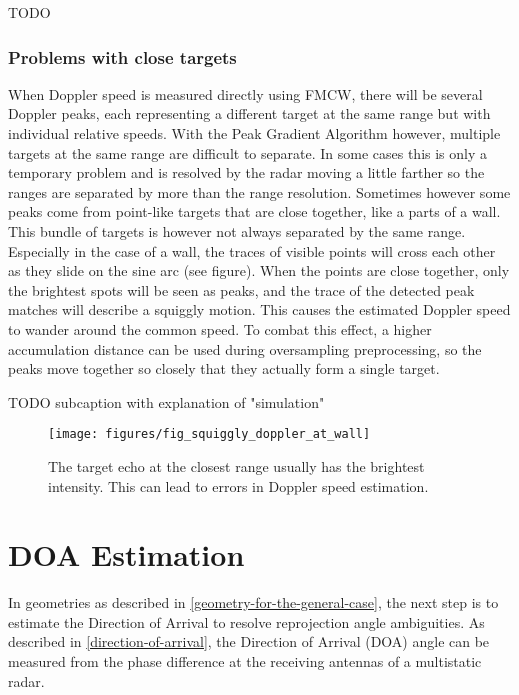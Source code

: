 TODO

\subsubsection{Problems with close targets}\label{problems-with-close-targets}

When Doppler speed is measured directly using FMCW, there will be
several Doppler peaks, each representing a different target at the same
range but with individual relative speeds. With the Peak Gradient
Algorithm however, multiple targets at the same range are difficult to
separate. In some cases this is only a temporary problem and is resolved
by the radar moving a little farther so the ranges are separated by more
than the range resolution. Sometimes however some peaks come from
point-like targets that are close together, like a parts of a wall. This
bundle of targets is however not always separated by the same range.
Especially in the case of a wall, the traces of visible points will
cross each other as they slide on the sine arc (see figure). When the
points are close together, only the brightest spots will be seen as
peaks, and the trace of the detected peak matches will describe a
squiggly motion. This causes the estimated Doppler speed to wander
around the common speed. To combat this effect, a higher accumulation
distance can be used during oversampling preprocessing, so the peaks
move together so closely that they actually form a single target.

TODO subcaption with explanation of "simulation"

\begin{figure}[htbp]
    \centering
    \texttt{[image: figures/fig\_squiggly\_doppler\_at\_wall]}
    \caption{The target echo at the closest range usually has the brightest intensity. This can lead to errors in Doppler speed estimation.}
    \label{fig:fig_squiggly_doppler_at_wall}
\end{figure}

\section{DOA Estimation}\label{doa-implementation}

In geometries as described in \cref{geometry-for-the-general-case}, the next step is to estimate the Direction of Arrival to resolve reprojection angle ambiguities.
As described in \cref{direction-of-arrival}, the Direction of Arrival (DOA) angle can be measured from the phase difference at the receiving antennas of a multistatic radar.

